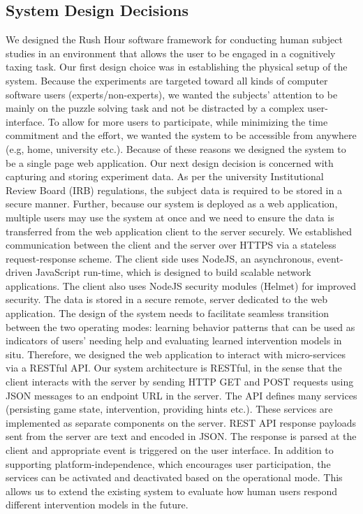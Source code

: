 \documentclass[doctor]{thesis} %
\theoremstyle{plain}
\begin{document}
\subsection*{System Design Decisions}
We designed the Rush Hour software framework for conducting human subject studies in an environment that allows the user to be engaged in a cognitively taxing task. Our first design choice was in establishing the physical setup of the system. Because the experiments are targeted toward all kinds of computer software users (experts/non-experts), we wanted the subjects' attention to be mainly on the puzzle solving task and not be distracted by a complex user-interface. To allow for more users to participate, while minimizing the time commitment and the effort, we wanted the system to be accessible from anywhere (e.g, home, university etc.). Because of these reasons we designed the system to be a single page web application.
Our next design decision is concerned with capturing and storing experiment data. As per the university Institutional Review Board (IRB) regulations, the subject data is required to be stored in a secure manner. Further, because our system is deployed as a web application, multiple users may use the system at once and we need to ensure the data is transferred from the web application client to the server securely. We established communication between the client and the server over HTTPS via a stateless request-response scheme. The client side uses NodeJS, an asynchronous, event-driven JavaScript run-time, which is designed to build scalable network applications.  The client also uses NodeJS security modules (Helmet) for improved security. The data is stored in a secure remote, server dedicated to the web application. The design of the system needs to facilitate seamless transition between the two operating modes: learning behavior patterns that can be used as indicators of users' needing help and evaluating learned intervention models in situ. Therefore,  we designed the web application to interact with micro-services via a RESTful API. Our system architecture is RESTful, in the sense that the client interacts with the server by sending HTTP GET and POST requests using JSON messages to an endpoint URL in the server. The API defines many services (persisting game state, intervention, providing hints etc.). These services are implemented as separate components on the server. REST API response payloads sent from the server are text and encoded in JSON. The response is parsed at the client and appropriate event is triggered on the user interface. In addition to supporting platform-independence, which encourages user participation, the services can be activated and deactivated based on the operational mode. This allows us to extend the existing system to evaluate how human users respond different intervention models in the future.
\end{document}
